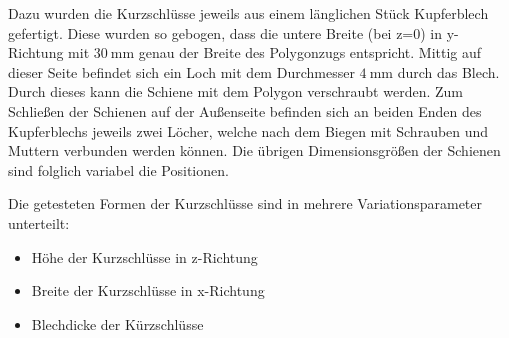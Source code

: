Dazu wurden die Kurzschl\"usse jeweils aus einem l\"anglichen St\"uck Kupferblech gefertigt. Diese wurden so gebogen, dass die untere Breite (bei z=0) in y-Richtung mit $\SI{30}{\milli\meter}$ genau der Breite des Polygonzugs entspricht. Mittig auf dieser Seite befindet sich ein Loch mit dem Durchmesser $\SI{4}{\milli\meter}$ durch das Blech. Durch dieses kann die Schiene mit dem Polygon verschraubt werden. Zum Schlie\ss{}en der Schienen auf der Au\ss{}enseite befinden sich an beiden Enden des Kupferblechs jeweils zwei L\"ocher, welche nach dem Biegen mit Schrauben und Muttern verbunden werden k\"onnen. Die \"ubrigen Dimensionsgr\"o\ss{}en der Schienen sind folglich variabel die Positionen.
\par
Die getesteten Formen der Kurzschl\"usse sind in mehrere Variationsparameter unterteilt:
\begin{itemize}
	\item H\"ohe der Kurzschl\"usse in z-Richtung
	\item Breite der Kurzschl\"usse in x-Richtung
	\item Blechdicke der K\"urzschl\"usse
\end{itemize}


\newpage




